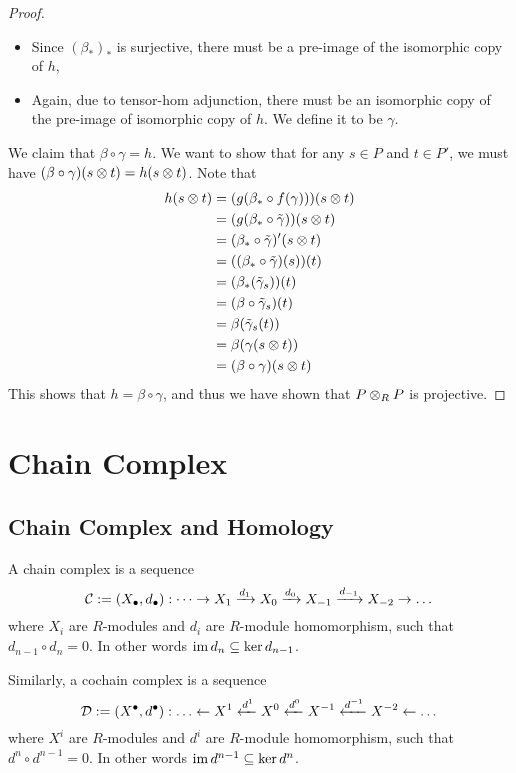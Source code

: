 \begin{proof}
\begin{itemize}
        \item Since $(\beta_*)_*$ is surjective, there must be a pre-image of the isomorphic copy of $h$,
        \item Again, due to tensor-hom adjunction, there must be an isomorphic copy of the pre-image of isomorphic copy of $h$. We define it to be $\gamma$.
    \end{itemize}
    We claim that $\beta\circ \gamma = h$. We want to show that for any $s\in P$ and $t\in P'$, we must have $(\beta\circ\gamma)(s\otimes t) = h(s\otimes t)$. Note that 
    \begin{align*}
        h(s\otimes t)
        &= (g(\beta_* \circ f(\gamma)))(s\otimes t) \\
        &= (g(\beta_* \circ \tilde\gamma))(s\otimes t)\\
        &= (\beta_* \circ \tilde\gamma)'(s\otimes t)\\
        &= ((\beta_* \circ \tilde\gamma)(s)) (t) \\
        &= (\beta_* (\tilde\gamma_s))(t) \\
        &= (\beta\circ \tilde\gamma_s)(t) \\
        &= \beta(\tilde\gamma_s(t)) \\
        &= \beta(\gamma(s\otimes t)) \\
        &= (\beta\circ \gamma)(s\otimes t)
    \end{align*}
    This shows that $h= \beta\circ \gamma$, and thus we have shown that $P\otimes_R P$ is projective.
\end{proof}

\newpage
\section{Chain Complex}
\subsection{Chain Complex and Homology}

\begin{defn}
    A chain complex is a sequence
    \[\mathcal C := (X_{\bullet}, d_\bullet):\dots \to X_1 \xrightarrow{d_1} X_0 \xrightarrow{d_0} X_{-1} \xrightarrow{d_{-1}} X_{-2} \to \dots\]
    where $X_i$ are $R$-modules and $d_i$ are $R$-module homomorphism, such that $d_{n-1}\circ d_n = 0$. In other words $\operatorname{im} d_n \subseteq \ker d_{n-1}$.

    Similarly, a cochain complex is a sequence 
    \[\mathcal D:=(X^{\bullet}, d^\bullet):\dots \ot X^1 \xot {d^1} X^0 \xot{d^0} X^{-1} \xot{d^{-1}} X^{-2} \ot \dots\]
    where $X^i$ are $R$-modules and $d^i$ are $R$-module homomorphism, such that $d^{n}\circ d^{n-1} = 0$. In other words $\operatorname{im} d^{n-1} \subseteq \ker d^{n}$.
\end{defn}


